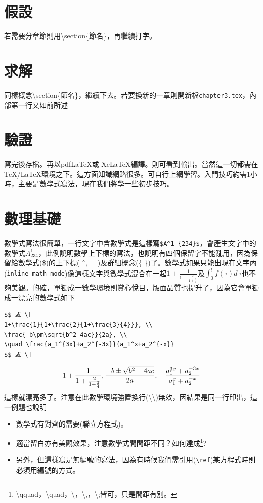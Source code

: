 \section{假設}
若需要分章節則用{\textbackslash section\{節名\}}，再繼續打字。
\section{求解}
同樣概念{\textbackslash section\{節名\}}，繼續下去。若要換新的一章則開新檔{\tt chapter3.tex}，內部第一行又如前所述

\section{驗證}
寫完後存檔。再以pdf\LaTeX{}或 Xe\LaTeX{}編譯。則可看到輸出。當然這一切都需在\TeX{}/\LaTeX{}環境之下。這方面知識網路很多。可自行上網學習。入門技巧約需1小時，主要是數學式寫法，現在我們將學一些初步技巧。
\section{數理基礎}
數學式寫法很簡單，一行文字中含數學式是這樣寫\verb|$A^1_{234}$|，會產生文字中的數學式$A^1_{234}$，此例說明數學上下標的寫法，也說明有四個保留字不能亂用，因為保留給數學式(\$)的上下標( \^\ , \_ )及群組概念(\{ \})了。數學式如果只能出現在文字內({\tt inline math mode})像這樣文字與數學式混合在一起$1+\frac{1}{1+\frac{2}{1+\frac{3}{4}}}$及$\displaystyle \int_0^t f(\tau) d\,\tau$也不夠美觀。的確，單獨成一數學環境則賞心悅目，版面品質也提升了，因為它會單獨成一漂亮的數學式如下  \index{\LaTeX{}環境!\textbackslash [}\index{\LaTeX{}環境!\textbackslash ]}
\begin{Verbatim}[frame=single,firstline=1,label=Form 1 w/o number]
$$ 或 \[
1+\frac{1}{1+\frac{2}{1+\frac{3}{4}}}, \\
\frac{-b\pm\sqrt{b^2-4ac}}{2a}, \\
\quad \frac{a_1^{3x}+a_2^{-3x}}{a_1^x+a_2^{-x}}
$$ 或 \]
\end{Verbatim}

$$ 
1+\frac{1}{1+\frac{2}{1+\frac{3}{4}}}, \\
\frac{-b\pm\sqrt{b^2-4ac}}{2a},\\
\quad \frac{a_1^{3x}+a_2^{-3x}}{a_1^x+a_2^{-x}}
$$
這樣就漂亮多了。注意在此數學環境強置換行(\textbackslash \textbackslash)無效，因結果是同一行印出，這一例題也說明
\begin{itemize}
\item 數學式有對齊的需要(聯立方程式)。
\item 適當留白亦有美觀效果，注意數學式間間距不同？如何達成\footnote{\textbackslash qquad，\textbackslash quad，\textbackslash ，\textbackslash,，\textbackslash;皆可，只是間距有別。}? 
\item 另外，但這樣寫是無編號的寫法，因為有時候我們需引用(\verb|\ref|)某方程式時則必須用編號的方式。
\end{itemize}
